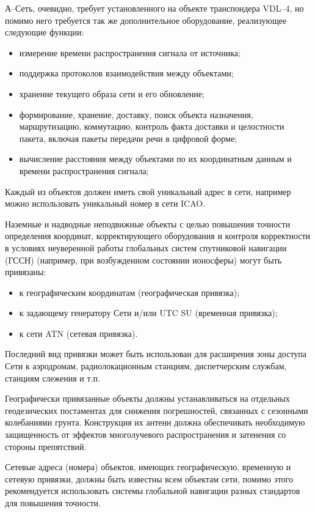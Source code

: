 \documentclass[a4paper,12pt]{report} %
\begin{document}
А--Сеть, очевидно, требует установленного на объекте транспондера VDL--4, но
помимо него требуется так же дополнительное оборудование, реализующее следующие
функции:
\begin{itemize}
\item измерение времени распространения сигнала от источника;
\item поддержка протоколов взаимодействия между объектами;
\item хранение текущего образа сети и его обновление;
\item формирование, хранение, доставку, поиск объекта назначения, маршрутизацию,
  коммутацию, контроль факта доставки и целостности пакета, включая пакеты
  передачи речи в цифровой форме;
\item вычисление расстояния между объектами по их координатным данным и времени
  распространения сигнала;
\end{itemize}

Каждый из объектов должен иметь свой уникальный адрес в сети, например можно
использовать уникальный номер в сети ICAO.

Наземные и надводные неподвижные объекты с целью повышения точности определения
координат, корректирующего оборудования и контроля корректности в условиях
неуверенной работы глобальных систем спутниковой навигации (ГССН) (например, при
возбужденном состоянии ионосферы) могут быть привязаны:
\begin{itemize}
\item к географическим координатам (географическая привязка);
\item к задающему генератору Сети и/или UTC SU (временная привязка);
\item к сети ATN (сетевая привязка).
\end{itemize}
Последний вид привязки может быть использован для расширения зоны доступа
Сети к аэродромам, радиолокационным станциям, диспетчерским службам, станциям
слежения и т.п.

Географически привязанные объекты должны устанавливаться на отдельных
геодезических постаментах для снижения погрешностей, связанных с сезонными
колебаниями грунта. Конструкция их антенн должна обеспечивать необходимую
защищенность от эффектов многолучевого распространения и затенения со стороны
препятствий.

Сетевые адреса (номера) объектов, имеющих географическую, временную и сетевую
привязки, должны быть известны всем объектам сети, помимо этого рекомендуется
использовать системы глобальной навигации разных стандартов для повышения
точности.
\end{document}
